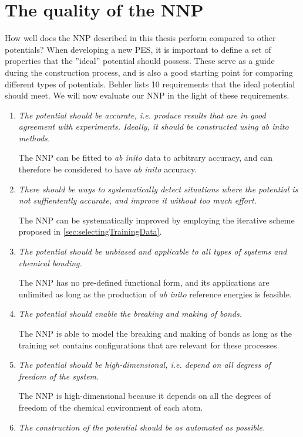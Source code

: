 \documentclass[twoside,english]{uiofysmaster}
\begin{document}
\chapter{The quality of the NNP}
How well does the NNP described in this thesis perform compared to other potentials? 
When developing a new PES, it is important to define a set of properties that the ''ideal'' potential 
should possess. These serve as a guide during the construction process, and is also a good 
starting point for comparing different types of potentials. Behler \cite{Behler11general} lists 10 requirements
that the ideal potential should meet. We will now evaluate our NNP in the light of these requirements. 
\begin{enumerate}
 \item \textit{The potential should be accurate, i.e. produce results that are in good agreement with experiments. 
       Ideally, it should be constructed using \textit{ab inito} methods.} 
       
       The NNP can be fitted to \textit{ab inito} data to arbitrary accuracy, and 
       can therefore be considered to have \textit{ab inito} accuracy.  
 \item \textit{There should be ways to systematically detect situations where the potential is not suffientently accurate, 
       and improve it without too much effort.} 
       
       The NNP can be systematically improved by employing the iterative scheme proposed in \autoref{sec:selectingTrainingData}.
 \item \textit{The potential should be unbiased and applicable to all types of systems and chemical bonding.} 
       
       The NNP has no pre-defined functional form, and its applications are unlimited as 
       long as the production of \textit{ab inito} reference energies is feasible. 
 \item \textit{The potential should enable the breaking and making of bonds.}
       
       The NNP is able to model the breaking and making of bonds as long as the training set contains
       configurations that are relevant for these processes.  
 \item \textit{The potential should be high-dimensional, i.e. depend on all degress of freedom of the system.}
       
       The NNP is high-dimensional because it depends on all the degrees of freedom of the chemical environment of each atom. 
 \item \textit{The construction of the potential should be as automated as possible.} 
       

\end{enumerate}
\end{document}
